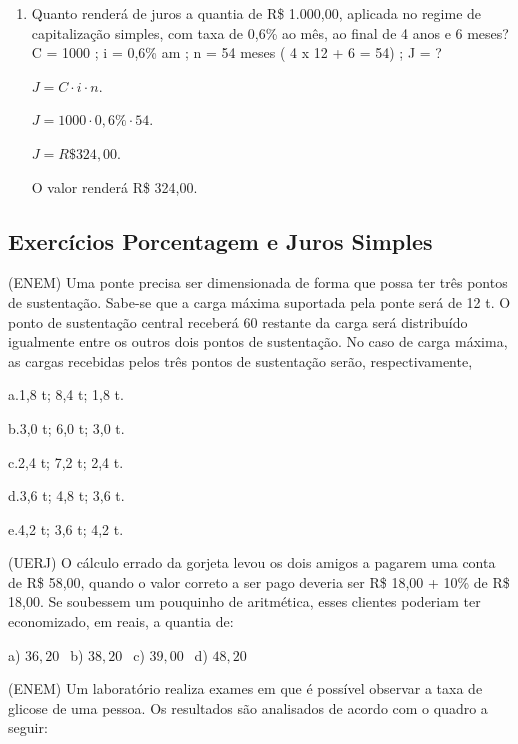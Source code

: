 \begin{multicols*}{2}
\begin{enumerate}
		\item Quanto renderá de juros a quantia de R\$ 1.000,00, aplicada no regime de capitalização simples, com taxa de 0,6\% ao mês, ao final de 4 anos e 6 meses? C = 1000 ; i = 0,6\% am ; n = 54 meses ( 4 x 12 + 6 = 54) ; J = ?

		      $ J = C \cdot i \cdot n$.

		      $ J = 1000 \cdot 0,6\% \cdot 54 $.

		      $ J = R\$ 324,00 $.

		      O valor renderá R\$ 324,00.

	\end{enumerate}

	\subsection{Exercícios Porcentagem e Juros Simples}

		\setcounter{numexercicio}{0}
		\execnum (ENEM) Uma ponte precisa ser dimensionada de forma que possa ter três pontos de sustentação. Sabe-se que a carga máxima suportada pela ponte será de 12 t. O ponto de sustentação central receberá 60%
		      restante da carga será distribuído igualmente entre os outros dois pontos de sustentação. No caso de carga máxima, as cargas recebidas pelos três pontos de sustentação serão, respectivamente,

		      a.1,8 t; 8,4 t; 1,8 t.

		      b.3,0 t; 6,0 t; 3,0 t.

		      c.2,4 t; 7,2 t; 2,4 t.

		      d.3,6 t; 4,8 t; 3,6 t.

		      e.4,2 t; 3,6 t; 4,2 t.

		\execnum (UERJ) O cálculo errado da gorjeta levou os dois amigos a pagarem uma conta de R\$ 58,00, quando o valor correto a ser pago deveria ser R\$ 18,00 + 10\% de R\$ 18,00. Se soubessem um pouquinho de aritmética, esses clientes
		      poderiam ter economizado, em reais, a quantia de:

		      a) $36,20 \ \ $ b) $38,20 \ \ $ c) $39,00 \ \ $ d) $48,20 $

		\execnum (ENEM) Um laboratório realiza exames em que é possível observar a taxa de glicose de uma pessoa. Os
		      resultados são analisados de acordo com o quadro a seguir:


\end{multicols*}
